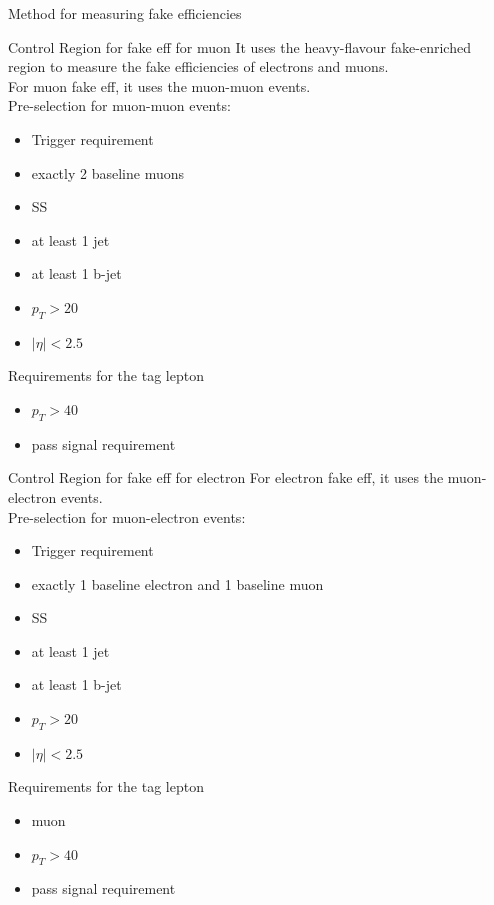 \documentclass[mathserif,serif]{beamer}
\begin{document}
\begin{frame}
\begin{center}
\huge
Method for measuring fake efficiencies
\end{center}
\end{frame}

\begin{frame}{Control Region for fake eff for muon}
It uses the heavy-flavour fake-enriched region to measure the fake efficiencies of electrons and muons. \\
For muon fake eff, it uses the muon-muon events. \\
Pre-selection for muon-muon events:
\begin{itemize}
\item Trigger requirement
\item exactly 2 baseline muons
\item SS
\item at least 1 jet
\item at least 1 b-jet
\item $p_T > 20$
\item $|\eta| < 2.5$
\end{itemize}
Requirements for the tag lepton
\begin{itemize}
\item $p_T > 40$
\item pass signal requirement
\end{itemize}
\end{frame}

\begin{frame}{Control Region for fake eff for electron}
For electron fake eff, it uses the muon-electron events. \\
Pre-selection for muon-electron events:
\begin{itemize}
\item Trigger requirement
\item exactly 1 baseline electron and 1 baseline muon
\item SS
\item at least 1 jet
\item at least 1 b-jet
\item $p_T > 20$
\item $|\eta| < 2.5$
\end{itemize}
Requirements for the tag lepton
\begin{itemize}
\item muon
\item $p_T > 40$
\item pass signal requirement
\end{itemize}
\end{frame}
\end{document}
